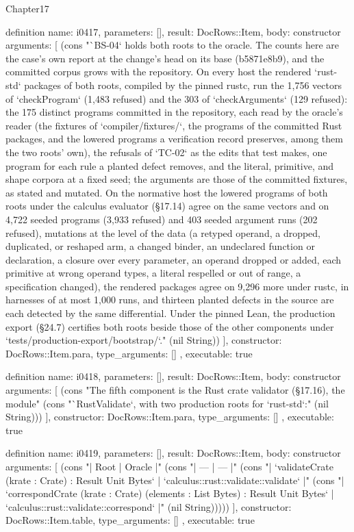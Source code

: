 \begin{lexlean}{Chapter17}
\begin{semanticmodule}
definition{
  name: i0417,
  parameters: [],
  result: DocRows::Item,
  body: constructor{
    arguments: [
      (cons "`BS-04` holds both roots to the oracle. The counts here are the case's own report at the change's head on its base (b5871e8b9), and the committed corpus grows with the repository. On every host the rendered `rust-std` packages of both roots, compiled by the pinned rustc, run the 1,756 vectors of `checkProgram` (1,483 refused) and the 303 of `checkArguments` (129 refused): the 175 distinct programs committed in the repository, each read by the oracle's reader (the fixtures of `compiler/fixtures/`, the programs of the committed Rust packages, and the lowered programs a verification record preserves, among them the two roots' own), the refusals of `TC-02` as the edits that test makes, one program for each rule a planted defect removes, and the literal, primitive, and shape corpora at a fixed seed; the arguments are those of the committed fixtures, as stated and mutated. On the normative host the lowered programs of both roots under the calculus evaluator (§17.14) agree on the same vectors and on 4,722 seeded programs (3,933 refused) and 403 seeded argument runs (202 refused), mutations at the level of the data (a retyped operand, a dropped, duplicated, or reshaped arm, a changed binder, an undeclared function or declaration, a closure over every parameter, an operand dropped or added, each primitive at wrong operand types, a literal respelled or out of range, a specification changed), the rendered packages agree on 9,296 more under rustc, in harnesses of at most 1,000 runs, and thirteen planted defects in the source are each detected by the same differential. Under the pinned Lean, the production export (§24.7) certifies both roots beside those of the other components under `tests/production-export/bootstrap/`." (nil String))
    ],
    constructor: DocRows::Item.para,
    type_arguments: []
  },
  executable: true
}

definition{
  name: i0418,
  parameters: [],
  result: DocRows::Item,
  body: constructor{
    arguments: [
      (cons "The fifth component is the Rust crate validator (§17.16), the module" (cons "`RustValidate`, with two production roots for `rust-std`:" (nil String)))
    ],
    constructor: DocRows::Item.para,
    type_arguments: []
  },
  executable: true
}

definition{
  name: i0419,
  parameters: [],
  result: DocRows::Item,
  body: constructor{
    arguments: [
      (cons "| Root | Oracle |" (cons "| --- | --- |" (cons "| `validateCrate (krate : Crate) : Result Unit Bytes` | `calculus::rust::validate::validate` |" (cons "| `correspondCrate (krate : Crate) (elements : List Bytes) : Result Unit Bytes` | `calculus::rust::validate::correspond` |" (nil String)))))
    ],
    constructor: DocRows::Item.table,
    type_arguments: []
  },
  executable: true
}


\end{semanticmodule}
\end{lexlean}
